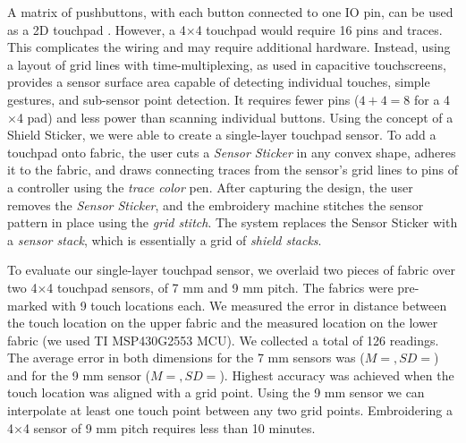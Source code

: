 \documentclass[header.tex]{subfiles}
\begin{document}
A matrix of pushbuttons, with each button connected to one IO pin, can be used as a 2D touchpad \cite{hamdan2016grabrics,5387040}. 
However, a 4$\times$4 touchpad would require 16 pins and traces. This complicates the wiring and may require additional hardware. Instead, using a layout of grid lines with time-multiplexing, as used in capacitive touchscreens, provides a sensor surface area capable of detecting individual touches, simple gestures, and sub-sensor point detection. It requires fewer pins ($4+4=8$ for a 4$\times$4 pad) and less power than scanning individual buttons. 
Using the concept of a Shield Sticker, we were able to create a single-layer touchpad sensor. To add a touchpad onto fabric, the user cuts a \textit{Sensor Sticker} in any convex shape, adheres it to the fabric, and draws connecting traces from the sensor's grid lines to pins of a controller using the \textit{trace color} pen. After capturing the design, the user removes the \textit{Sensor Sticker}, and the embroidery machine stitches the sensor pattern in place using the \textit{grid stitch}. The system replaces the Sensor Sticker with a \textit{sensor stack}, which is essentially a grid of \textit{shield stacks}.


To evaluate our single-layer touchpad sensor, we overlaid two pieces of fabric over two 4$\times$4 touchpad sensors, of 7 mm and 9 mm pitch. The fabrics were pre-marked with 9 touch locations each. We measured the error in distance between the touch location on the upper fabric and the measured location on the lower fabric (we used TI MSP430G2553 MCU). We collected a total of 126 readings. The average error in both dimensions for the 7 mm sensors was ($M = , SD = $) and for the 9 mm sensor ($M = , SD = $).  Highest accuracy was achieved when the touch location was aligned with a grid point. Using the 9 mm sensor we can interpolate at least one touch point between any two grid points. Embroidering a 4$\times$4 sensor of 9 mm pitch requires less than 10 minutes.
\end{document}
